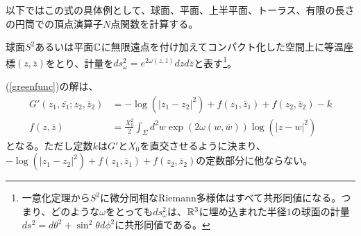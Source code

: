 以下ではこの式の具体例として、球面、平面、上半平面、トーラス、有限の長さの円筒での頂点演算子$N$点関数を計算する。

球面$S^2$あるいは平面$\mathbb{C}$に無限遠点を付け加えてコンパクト化した空間上に等温座標$(z,\overline{z})$をとり、計量を$ds_\omega^2=e^{2\omega(z,\overline{z})}dzd\overline{z}$と表す\footnote{一意化定理から$S^2$に微分同相なRiemann多様体はすべて共形同値になる。つまり、どのような$\omega$をとっても$ds_\omega^2$は、$\mathbb{R}^3$に埋め込まれた半径$1$の球面の計量$ds^2=d\theta^2+\sin^2 \theta d\phi^2$に共形同値である。}。

(\ref{greenfunc})の解は、
\begin{align}
G'(z_1,\overline{z_1};z_2,\overline{z}_2)&=-\log (|z_1-z_2|^2)+f(z_1,\overline{z}_1)+f(z_2,\overline{z}_2)-k\\
f(z,\overline{z})&=\frac{X_0^2}{2}\int_\Sigma d^2 w \exp(2\omega(w,\overline{w}))\log (|z-w|^2)
\end{align}
となる。ただし定数$k$は$G'$と$X_0$を直交させるように決まり、$-\log (|z_1-z_2|^2)+f(z_1,\overline{z}_1)+f(z_2,\overline{z}_2)$の定数部分に他ならない。

